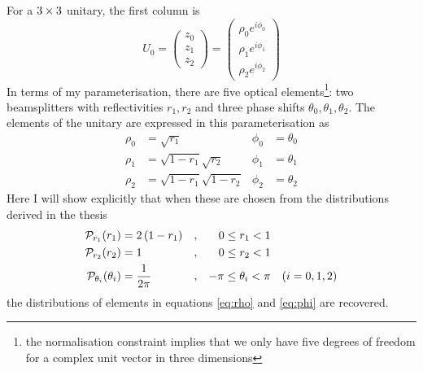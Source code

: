 \documentclass[a4paper,11pt]{article}
\begin{document}
For a \(3 \times 3\) unitary, the first column is
\begin{equation}
  U_{0} = \begin{pmatrix}
    z_{0} \\ z_{1} \\ z_{2}
  \end{pmatrix} = \begin{pmatrix}
    \rho_{0} e^{i \phi_{0}} \\
    \rho_{1} e^{i \phi_{1}} \\
    \rho_{2} e^{i \phi_{2}}
  \end{pmatrix}
\end{equation}
In terms of my parameterisation, there are five optical elements\footnote{the
normalisation constraint implies that we only have five degrees of freedom for a
complex unit vector in three dimensions}: two beamsplitters with reflectivities
\(r_{1}, r_{2}\) and three phase shifts \(\theta_{0}, \theta_{1}, \theta_{2}\).
The elements of the unitary are expressed in this parameterisation as
\begin{align}
  \rho_{0} &= \sqrt{r_{1}} & \phi_{0} &= \theta_{0} \\
  \rho_{1} &= \sqrt{1-r_{1}} \sqrt{r_{2}} & \phi_{1} &= \theta_{1} \\
  \rho_{2} &= \sqrt{1-r_{1}} \sqrt{1-r_{2}} & \phi_{2} &= \theta_{2}
\end{align}
Here I will show explicitly that when these are chosen from the distributions
derived in the thesis
\begin{align}
  \mathcal{P}_{r_{1}} \!\left(r_{1}\right) &= 2 \left( 1-r_{1} \right) &,
    && 0 \leq r_{1} < 1 \\
  \mathcal{P}_{r_{2}} \!\left(r_{2}\right) &= 1 &,
    && 0 \leq r_{2} < 1 \\
  \label{eq:theta}
  \mathcal{P}_{\theta_{i}} \!\left(\theta_{i}\right) &= \frac{1}{2 \pi} &,
    && -\pi \leq \theta_{i} < \pi && \left( i=0,1,2 \right)
\end{align}
the distributions of elements in equations \ref{eq:rho} and \ref{eq:phi} are
recovered.
\end{document}
